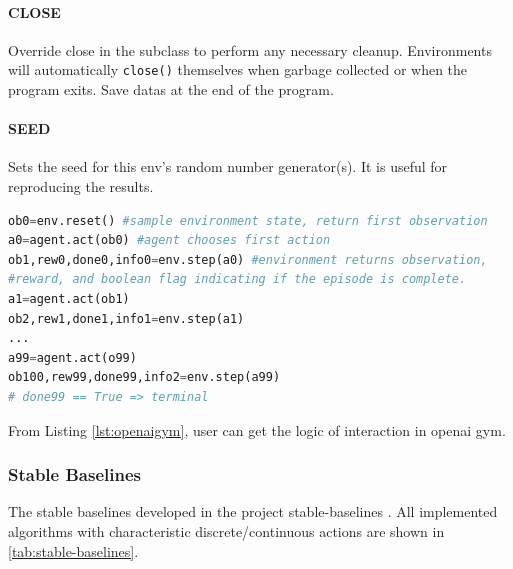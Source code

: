 \paragraph{CLOSE} Override close in the subclass to perform any necessary cleanup. Environments will automatically \texttt{close()} themselves when garbage collected or when the program exits. Save datas at the end of the program.
\paragraph{SEED} Sets the seed for this env's random number generator(s). It is useful for reproducing the results.
\begin{lstlisting}[caption={Logic of \gls{openai gym} Interaction},label={lst:openaigym},language=python]
ob0=env.reset() #sample environment state, return first observation
a0=agent.act(ob0) #agent chooses first action
ob1,rew0,done0,info0=env.step(a0) #environment returns observation,
#reward, and boolean flag indicating if the episode is complete.
a1=agent.act(ob1)
ob2,rew1,done1,info1=env.step(a1)
...
a99=agent.act(o99)
ob100,rew99,done99,info2=env.step(a99)
# done99 == True => terminal
\end{lstlisting}

From Listing \ref{lst:openaigym}, user can get the logic of interaction in \gls{openai gym}.

\subsubsection{Stable Baselines}
The stable baselines developed in the project stable-baselines \parencite{stable-baselines}. All implemented algorithms with characteristic discrete/continuous actions are shown in \ref{tab:stable-baselines}.

